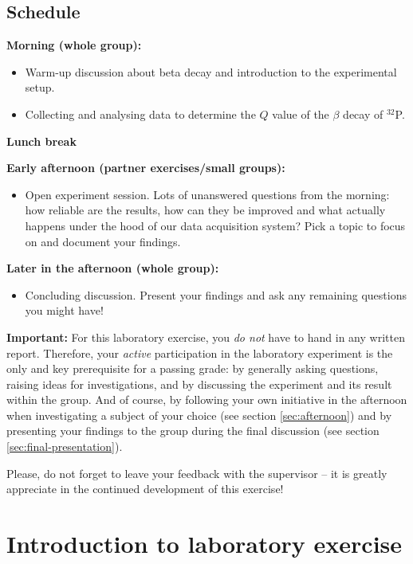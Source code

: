 \documentclass[a4,11pt, notitlepage]{article}
\begin{document}
\subsection{Schedule}

\textbf{Morning (whole group):} 
\begin{itemize}
\item Warm-up discussion about beta decay and introduction to the
  experimental setup.
\item Collecting and analysing data to determine the $Q$ value of the
  $\beta$ decay of $^{32}$P.
\end{itemize}

\textbf{Lunch break} 

\textbf{Early afternoon (partner exercises/small groups):} 
\begin{itemize}
\item Open experiment session. Lots of unanswered questions from the
  morning: how reliable are the results, how can they be improved and
  what actually happens under the hood of our data acquisition system?
  Pick a topic to focus on and document your findings.
\end{itemize}

\textbf{Later in the afternoon (whole group):} 
\begin{itemize}
\item Concluding discussion. Present your findings and ask any
  remaining questions you might have!
\end{itemize}


\textbf{Important: }For this laboratory exercise, you \emph{do not} have to hand in any
written report. Therefore, your \emph{active} participation in the laboratory experiment is
the only and key prerequisite for a passing grade: by generally asking questions,
raising ideas for investigations, and by discussing the experiment and
its result within the group. And of course, by following your own
initiative in the afternoon when investigating a subject of your
choice (see section \ref{sec:afternoon}) and by presenting your
findings to the group during the final discussion (see section
\ref{sec:final-presentation}).

Please, do not forget to leave your feedback with the supervisor -- it
is greatly appreciate in the continued development of this exercise!

\pagebreak
\section{Introduction to laboratory exercise}
\end{document}
